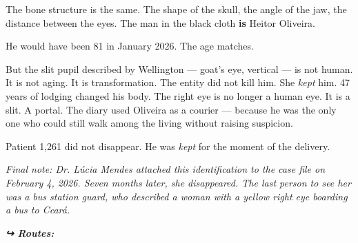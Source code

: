 \noindent The bone structure is the same. The shape of the skull, the angle of the jaw, the distance between the eyes. The man in the black cloth \textbf{is} Heitor Oliveira.

\noindent He would have been 81 in January 2026. The age matches.

\noindent But the slit pupil described by Wellington --- goat's eye, vertical --- is not human. It is not aging. It is transformation. The entity did not kill him. She \textit{kept} him. 47 years of lodging changed his body. The right eye is no longer a human eye. It is a slit. A portal. The diary used Oliveira as a courier --- because he was the only one who could still walk among the living without raising suspicion.

\noindent Patient 1,261 did not disappear. He was \textit{kept} for the moment of the delivery.

\noindent \textit{Final note: Dr. Lúcia Mendes attached this identification to the case file on February 4, 2026. Seven months later, she disappeared. The last person to see her was a bus station guard, who described a woman with a yellow right eye boarding a bus to Ceará.}

\vspace{0.5em}
\noindent\textit{\textbf{↪ Routes:}  \rotasep {} \rotasep {}}
